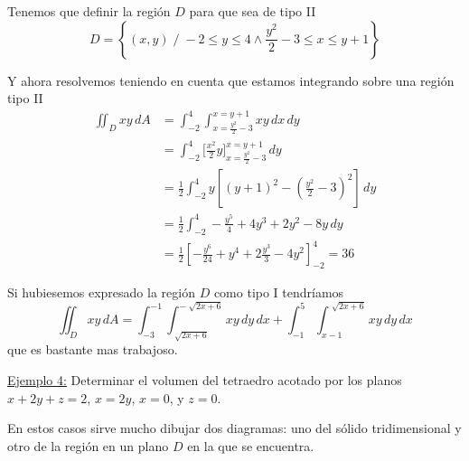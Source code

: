 \documentclass[12pt]{article}
\begin{document}
Tenemos que definir la región $ D $ para que sea de tipo II
\[
  D=\left\{(x,y) \;/\; -2\leq y\leq 4 \land \frac{y^2}{2}-3\leq x\leq y+1\right\}
\]

Y ahora resolvemos teniendo en cuenta que estamos integrando sobre una región tipo II
\begin{align*}
  \iint_{D} xy \,dA &= \int_{-2}^{4} \int_{x=\frac{y^2}{2}-3}^{x=y+1} xy \,dx\,dy\\
   &= \int_{-2}^{4} \Bigg[\frac{x^2}{2}y\Bigg]_{x=\frac{y^2}{2}-3}^{x=y+1} \,dy\\
    &= \frac{1}{2}\int_{-2}^{4} y\left[\left(y+1\right)^2-\left(\frac{y^2}{2}-3\right)^2\right] \,dy\\
     &= \frac{1}{2}\int_{-2}^{4} -\frac{y^5}{4}+4y^3+2y^2-8y \,dy\\
     &= \frac{1}{2}\left[-\frac{y^6}{24}+y^4+2\frac{y^3}{3}-4y^2\right]_{-2}^{4}=36
\end{align*}

Si hubiesemos expresado la región $ D $ como tipo I tendríamos
\[
  \iint_{D} xy \,dA=\int_{-3}^{-1} \int_{\sqrt[]{2x+6}}^{-\sqrt[]{2x+6}} xy \,dy\,dx + \int_{-1}^{5} \int_{x-1}^{\sqrt[]{2x+6}} xy \,dy\,dx
\]
que es bastante mas trabajoso.

\underline{Ejemplo 4:} Determinar el volumen del tetraedro acotado por los planos $ x+2y+z=2 $, $ x=2y $, $ x=0 $, y $ z=0 $.

En estos casos sirve mucho dibujar dos diagramas: uno del sólido tridimensional y otro de la región en un plano $ D $ en la que se encuentra. 
\end{document}

